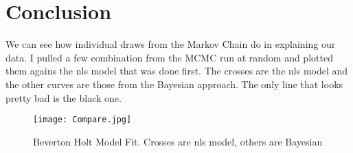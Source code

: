 \documentclass{article}
\begin{document}
\section{Conclusion}
We can see how individual draws from the Markov Chain do in explaining our data. I pulled a few combination from the MCMC run at random and plotted them agains the nls model that was done first. The crosses are the nls model and the other curves are those from the Bayesian approach. The only line that looks pretty bad is the black one. 

\begin{figure}[H]
    \centering
    \texttt{[image: Compare.jpg]}
    \caption{Beverton Holt Model Fit. Crosses are nls model, others are Bayesian}
    \label{Fig.3}
\end{figure}
\end{document}
